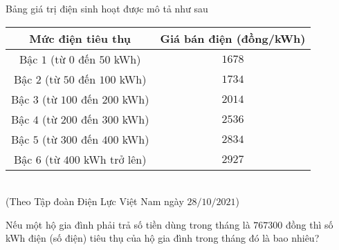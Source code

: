 \begin{bt}%
	Bảng giá trị điện sinh hoạt được mô tả như sau
	\begin{center}
		\begin{tabular}{|c|c|}
			\hline
			Mức điện tiêu thụ	& Giá bán điện (đồng/kWh)\\
			\hline
			Bậc $1$ (từ $0$ đến $50$ kWh)	& $1678$\\
			\hline
			Bậc $2$ (từ $50$ đến $100$ kWh)	& $1734$\\
			\hline
			Bậc $3$ (từ $100$ đến $200$ kWh)	& $2014$\\
			\hline
			Bậc $4$ (từ $200$ đến $300$ kWh)	& $2536$\\
			\hline
			Bậc $5$ (từ $300$ đến $400$ kWh)	& $2834$\\
			\hline
			Bậc $6$ (từ $400$ kWh trở lên)	& $2927$\\
			\hline
		\end{tabular}\\
		(Theo Tập đoàn Điện Lực Việt Nam ngày $28/10/2021$)
	\end{center}
	Nếu một hộ gia đình phải trả số tiền dùng trong tháng là $767300$ đồng thì số kWh điện (số điện) tiêu thụ của hộ gia đình trong tháng đó là bao nhiêu?
\end{bt}


